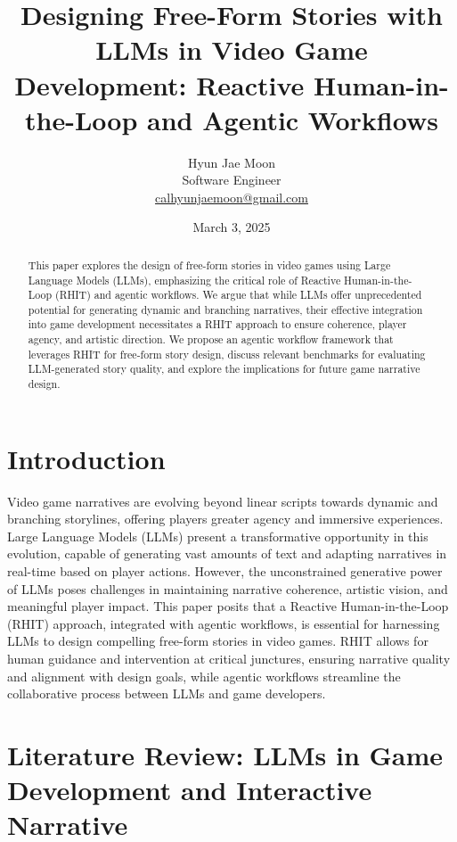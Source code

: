 \documentclass{article}
\title{Designing Free-Form Stories with LLMs in Video Game Development: Reactive Human-in-the-Loop and Agentic Workflows}
\author{Hyun Jae Moon \\ \small Software Engineer \\ \small \href{mailto:calhyunjaemoon@gmail.com}{calhyunjaemoon@gmail.com}}
\date{March 3, 2025}
\begin{document}
\maketitle

\begin{abstract}
This paper explores the design of free-form stories in video games using Large Language Models (LLMs), emphasizing the critical role of Reactive Human-in-the-Loop (RHIT) and agentic workflows.  We argue that while LLMs offer unprecedented potential for generating dynamic and branching narratives, their effective integration into game development necessitates a RHIT approach to ensure coherence, player agency, and artistic direction.  We propose an agentic workflow framework that leverages RHIT for free-form story design, discuss relevant benchmarks for evaluating LLM-generated story quality, and explore the implications for future game narrative design.
\end{abstract}

\section{Introduction}

Video game narratives are evolving beyond linear scripts towards dynamic and branching storylines, offering players greater agency and immersive experiences. Large Language Models (LLMs) present a transformative opportunity in this evolution, capable of generating vast amounts of text and adapting narratives in real-time based on player actions. However, the unconstrained generative power of LLMs poses challenges in maintaining narrative coherence, artistic vision, and meaningful player impact. This paper posits that a Reactive Human-in-the-Loop (RHIT) approach, integrated with agentic workflows, is essential for harnessing LLMs to design compelling free-form stories in video games.  RHIT allows for human guidance and intervention at critical junctures, ensuring narrative quality and alignment with design goals, while agentic workflows streamline the collaborative process between LLMs and game developers.

\section{Literature Review: LLMs in Game Development and Interactive Narrative}
\end{document}
